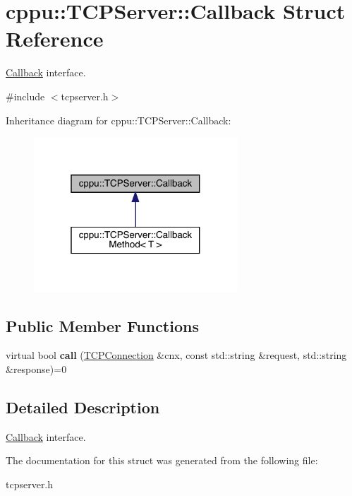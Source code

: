 \hypertarget{structcppu_1_1_t_c_p_server_1_1_callback}{}\section{cppu\+::T\+C\+P\+Server\+::Callback Struct Reference}
\label{structcppu_1_1_t_c_p_server_1_1_callback}


\mbox{\hyperlink{structcppu_1_1_t_c_p_server_1_1_callback}{Callback}} interface.  




{\ttfamily \#include $<$tcpserver.\+h$>$}



Inheritance diagram for cppu\+::T\+C\+P\+Server\+::Callback\+:
\nopagebreak
\begin{figure}[H]
\begin{center}
\leavevmode
\includegraphics[width=217pt]{structcppu_1_1_t_c_p_server_1_1_callback__inherit__graph}
\end{center}
\end{figure}
\subsection*{Public Member Functions}
\begin{DoxyCompactItemize}
\item 
\mbox{\label{structcppu_1_1_t_c_p_server_1_1_callback_aabe4b0b30e14ddeb7c0c02aa3a335eba}} 
virtual bool {\bfseries call} (\mbox{\hyperlink{classcppu_1_1_t_c_p_connection}{T\+C\+P\+Connection}} \&cnx, const std\+::string \&request, std\+::string \&response)=0
\end{DoxyCompactItemize}


\subsection{Detailed Description}
\mbox{\hyperlink{structcppu_1_1_t_c_p_server_1_1_callback}{Callback}} interface. 

The documentation for this struct was generated from the following file\+:\begin{DoxyCompactItemize}
\item 
tcpserver.\+h\end{DoxyCompactItemize}
